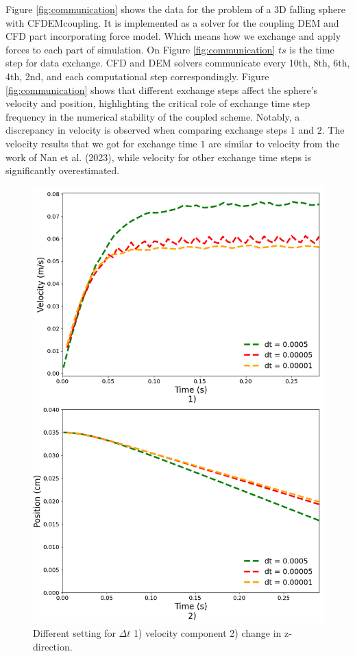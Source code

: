 Figure \ref{fig:communication} shows the data for the problem of a 3D falling sphere with CFDEMcoupling. It is implemented as a solver for the coupling DEM and CFD part incorporating force model. Which means how we exchange and apply forces to each part of simulation. On Figure \ref{fig:communication} $ts$ is the time step for data exchange. CFD and DEM solvers communicate every 10th, 8th, 6th, 4th, 2nd, and each computational step correspondingly. Figure \ref{fig:communication} shows that different exchange steps affect the sphere's velocity and position, highlighting the critical role of exchange time step frequency in the numerical stability of the coupled scheme. Notably, a discrepancy in velocity is observed when comparing exchange steps $1$ and $2$. The velocity results that we got for exchange time $1$ are similar to velocity from the work of Nan et al. (2023)\cite{nan2023high}, while velocity for other exchange time steps is significantly overestimated.


\begin{figure}[H]
    \centering
    \includegraphics[width=12cm]{ GWU_Thesis_Sarmakeeva/Images/chap3/nan_simulation_192000_cells_dt_different.png }
    \caption{ Different setting for $\Delta t$ 1) velocity component 2) change in z-direction.}
    \label{fig:diff_dt}
\end{figure}

